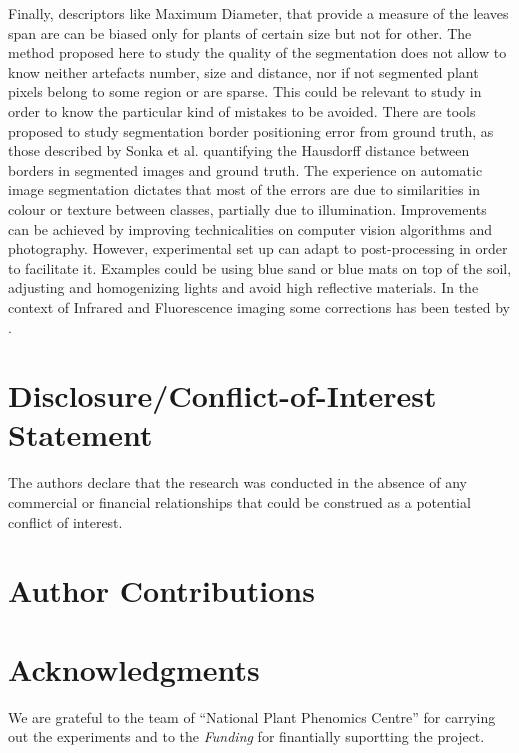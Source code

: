 \documentclass{frontiersSCNS} %
\begin{document}
Finally, descriptors like Maximum Diameter, that provide a measure of the leaves span are can be biased only for plants of certain size but not for other.
The method proposed here to study the quality of the segmentation does not allow to know neither artefacts number, size and distance, nor if not segmented plant pixels belong to some region or are sparse. This could be relevant to study in order to know the particular kind of mistakes to be avoided. There are tools proposed to study segmentation border positioning error from ground truth, as those described by Sonka et al. quantifying the Hausdorff distance between borders in segmented images and ground truth.
The experience on automatic image segmentation dictates that most of the errors are due to similarities in colour or texture between classes, partially due to illumination. Improvements can be achieved by improving technicalities on computer vision algorithms and photography. However, experimental set up can adapt to post-processing in order to facilitate it. Examples could be using blue sand or blue mats on top of the soil, adjusting and homogenizing lights and avoid high reflective materials. In the context of Infrared and Fluorescence imaging some corrections has been tested by \cite{fpls.2014.00770}.


\section*{Disclosure/Conflict-of-Interest Statement}


The authors declare that the research was conducted in the absence of any commercial or financial relationships that could be construed as a potential conflict of interest.

\section*{Author Contributions}



\section*{Acknowledgments}
 We are grateful to the team of “National Plant Phenomics Centre” for carrying out the experiments and to the 
\textit{Funding\textcolon} for finantially suportting the project.




\end{document}

